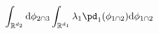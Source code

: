 \begin{equation}
  \int_{\mathbb{R}^{d_{2}}}
  \text{d}\phi_{2 \cap 3}
  \int_{\mathbb{R}^{d_{1}}} 
    \lambda_{1} \pd_{1}(\phi_{1 \cap 2})
  \text{d}\phi_{1 \cap 2}
  \label{eqn:int-linear-pooling-2}
\end{equation}